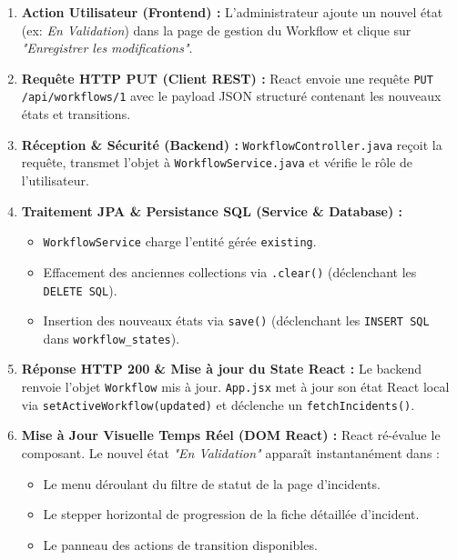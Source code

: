 \documentclass[11pt,a4paper]{article}
\begin{document}
\begin{tcolorbox}[colback=greenaccent!5,colframe=greenaccent,arc=4pt,title=\textbf{Parcours d'une Modification en 6 Étapes}]
\begin{enumerate}
    \item \textbf{Action Utilisateur (Frontend) :} L'administrateur ajoute un nouvel état (ex: \textit{En Validation}) dans la page de gestion du Workflow et clique sur \textit{"Enregistrer les modifications"}.
    \item \textbf{Requête HTTP PUT (Client REST) :} React envoie une requête \texttt{PUT /api/workflows/1} avec le payload JSON structuré contenant les nouveaux états et transitions.
    \item \textbf{Réception \& Sécurité (Backend) :} \texttt{WorkflowController.java} reçoit la requête, transmet l'objet à \texttt{WorkflowService.java} et vérifie le rôle de l'utilisateur.
    \item \textbf{Traitement JPA \& Persistance SQL (Service \& Database) :}
    \begin{itemize}
        \item \texttt{WorkflowService} charge l'entité gérée \texttt{existing}.
        \item Effacement des anciennes collections via \texttt{.clear()} (déclenchant les \texttt{DELETE SQL}).
        \item Insertion des nouveaux états via \texttt{save()} (déclenchant les \texttt{INSERT SQL} dans \texttt{workflow\_states}).
    \end{itemize}
    \item \textbf{Réponse HTTP 200 \& Mise à jour du State React :} Le backend renvoie l'objet \texttt{Workflow} mis à jour. \texttt{App.jsx} met à jour son état React local via \texttt{setActiveWorkflow(updated)} et déclenche un \texttt{fetchIncidents()}.
    \item \textbf{Mise à Jour Visuelle Temps Réel (DOM React) :} React ré-évalue le composant. Le nouvel état \textit{"En Validation"} apparaît instantanément dans :
    \begin{itemize}
        \item Le menu déroulant du filtre de statut de la page d'incidents.
        \item Le stepper horizontal de progression de la fiche détaillée d'incident.
        \item Le panneau des actions de transition disponibles.
    \end{itemize}
\end{enumerate}
\end{tcolorbox}
\end{document}
